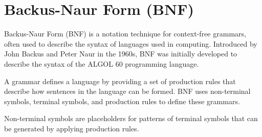 \newpage
%		

\section{Backus-Naur Form (BNF)}

Backus-Naur Form (BNF) is a notation technique for context-free grammars, often used to describe the syntax of languages used in computing. Introduced by John Backus and Peter Naur in the 1960s, BNF was initially developed to describe the syntax of the ALGOL 60 programming language.

A grammar defines a language by providing a set of production rules that describe how sentences in the language can be formed. BNF uses non-terminal symbols, terminal symbols, and production rules to define these grammars.

Non-terminal symbols are placeholders for patterns of terminal symbols that can be generated by applying production rules.

